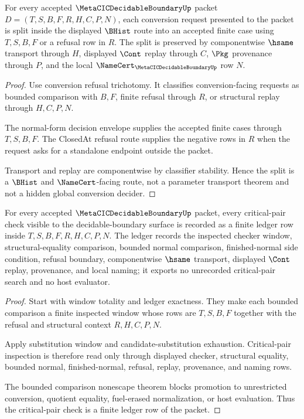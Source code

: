 \begin{theorem}
\label{thm:metacic-decidable-boundary-conversion-case-split}
For every accepted $\MetaCICDecidableBoundaryUp$ packet $D=(T,S,B,F,R,H,C,P,N)$, each conversion request presented to the packet is split inside the displayed $\BHist$ route into an accepted finite case using $T,S,B,F$ or a refusal row in $R$. The split is preserved by componentwise $\hsame$ transport through $H$, displayed $\Cont$ replay through $C$, $\Pkg$ provenance through $P$, and the local $\NameCert_{\MetaCICDecidableBoundaryUp}$ row $N$.
\end{theorem}
\begin{proof}
Use conversion refusal trichotomy. It classifies conversion-facing requests as bounded comparison with $B,F$, finite refusal through $R$, or structural replay through $H,C,P,N$.

The normal-form decision envelope supplies the accepted finite cases through $T,S,B,F$. The ClosedAt refusal route supplies the negative rows in $R$ when the request asks for a standalone endpoint outside the packet.

Transport and replay are componentwise by classifier stability. Hence the split is a $\BHist$ and $\NameCert$-facing route, not a parameter transport theorem and not a hidden global conversion decider.
\end{proof}

\begin{theorem}
\label{thm:metacic-decidable-boundary-critical-pair-finiteness}
For every accepted $\MetaCICDecidableBoundaryUp$ packet, every critical-pair check visible to the decidable-boundary surface is recorded as a finite ledger row inside $T,S,B,F,R,H,C,P,N$. The ledger records the inspected checker window, structural-equality comparison, bounded normal comparison, finished-normal side condition, refusal boundary, componentwise $\hsame$ transport, displayed $\Cont$ replay, provenance, and local naming; it exports no unrecorded critical-pair search and no host evaluator.
\end{theorem}
\begin{proof}
Start with window totality and ledger exactness. They make each bounded comparison a finite inspected window whose rows are $T,S,B,F$ together with the refusal and structural context $R,H,C,P,N$.

Apply substitution window and candidate-substitution exhaustion. Critical-pair inspection is therefore read only through displayed checker, structural equality, bounded normal, finished-normal, refusal, replay, provenance, and naming rows.

The bounded comparison nonescape theorem blocks promotion to unrestricted conversion, quotient equality, fuel-erased normalization, or host evaluation. Thus the critical-pair check is a finite ledger row of the packet.
\end{proof}

